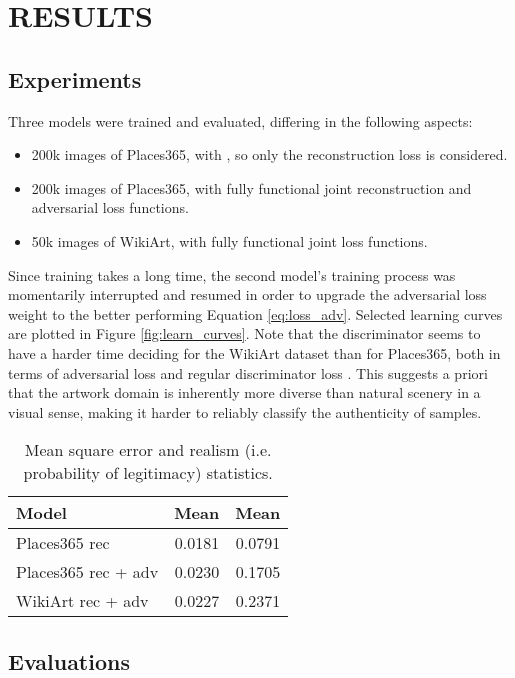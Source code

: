 \documentclass[twocolumn,showpacs,nofootinbib,aps,superscriptaddress,eqsecnum,prd,notitlepage,showkeys,10pt]{revtex4-1}
\begin{document}
\section{RESULTS}

\subsection{Experiments}

\hspace{\parindent} Three models were trained and evaluated, differing in the following aspects:
\begin{itemize}
  \item 200k images of Places365, with , so only the  reconstruction loss is considered.
  \item 200k images of Places365, with fully functional joint reconstruction and adversarial loss functions.
  \item 50k images of WikiArt, with fully functional joint loss functions.
\end{itemize}
Since training takes a long time, the second model's training process was momentarily interrupted and resumed in order to upgrade the adversarial loss weight to the better performing Equation \ref{eq:loss_adv}. Selected learning curves are plotted in Figure \ref{fig:learn_curves}. Note that the discriminator  seems to have a harder time deciding for the WikiArt dataset than for Places365, both in terms of adversarial loss  and regular discriminator loss . This suggests a priori that the artwork domain is inherently more diverse than natural scenery in a visual sense, making it harder to reliably classify the authenticity of samples.

\begin{table}[tp]
\centering
\begin{tabular}{l r r}
  \hline
  Model & Mean  & Mean  \\ \hline\hline
  Places365 rec & 0.0181 & 0.0791 \\
  Places365 rec + adv & 0.0230 & 0.1705 \\
  WikiArt rec + adv & 0.0227 & 0.2371 \\ \hline
\end{tabular}
\caption{Mean square error and realism (i.e. probability of legitimacy) statistics.}
\label{tab:quant}
\end{table}

\subsection{Evaluations}
\end{document}
